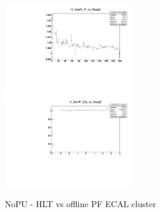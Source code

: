 
\begin{figure}
\includegraphics[width=0.495\textwidth]{./plots_pdf/ECAL_plots/Prod6/NoPU/H_GenPi_Pt_vs_RespE.pdf}
\includegraphics[width=0.495\textwidth]{./plots_pdf/ECAL_plots/Prod6/NoPU/H_GenPi_Eta_vs_RespE.pdf}
\caption [HLT vs offline PF ECAL cluster for NoPU senario]{NoPU - HLT vs offline PF ECAL cluster}
\label{fig:NoPU_ECAL_Offline_vs_Online_E}
\end{figure}

